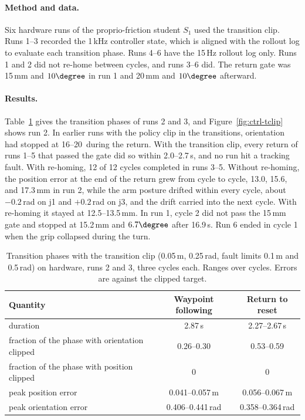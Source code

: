 \paragraph{Method and data.} Six hardware runs of the proprio-friction student $S_1$ used the transition clip. Runs 1--3 recorded the 1\,kHz controller state, which is aligned with the rollout log to evaluate each transition phase. Runs 4--6 have the 15\,Hz rollout log only. Runs 1 and 2 did not re-home between cycles, and runs 3--6 did. The return gate was 15\,mm and $10\degree$ in run 1 and 20\,mm and $10\degree$ afterward.

\paragraph{Results.} Table~\ref{tab:ctrl-tclip} gives the transition phases of runs 2 and 3, and Figure~\ref{fig:ctrl-tclip} shows run 2. In earlier runs with the policy clip in the transitions, orientation had stopped at 16--20\degree\ during the return. With the transition clip, every return of runs 1--5 that passed the gate did so within 2.0--2.7\,s, and no run hit a tracking fault. With re-homing, 12 of 12 cycles completed in runs 3--5. Without re-homing, the position error at the end of the return grew from cycle to cycle, 13.0, 15.6, and 17.3\,mm in run 2, while the arm posture drifted within every cycle, about $-0.2$\,rad on j1 and $+0.2$\,rad on j3, and the drift carried into the next cycle. With re-homing it stayed at 12.5--13.5\,mm. In run 1, cycle 2 did not pass the 15\,mm gate and stopped at 15.2\,mm and $6.7\degree$ after 16.9\,s. Run 6 ended in cycle 1 when the grip collapsed during the turn.

\begin{table}[!htbp]%
    \centering%
    \caption[Transition phases with the transition clip]{Transition phases with the transition clip (0.05\,m, 0.25\,rad, fault limits 0.1\,m and 0.5\,rad) on hardware, runs 2 and 3, three cycles each. Ranges over cycles. Errors are against the clipped target.}%
    \label{tab:ctrl-tclip}%
    \small
    \begin{tabular}{lcc}
        \toprule
        Quantity & Waypoint following & Return to reset \\
        \midrule
        duration & 2.87\,s & 2.27--2.67\,s \\
        fraction of the phase with orientation clipped & 0.26--0.30 & 0.53--0.59 \\
        fraction of the phase with position clipped & 0 & 0 \\
        peak position error & 0.041--0.057\,m & 0.056--0.067\,m \\
        peak orientation error & 0.406--0.441\,rad & 0.358--0.364\,rad \\
        \bottomrule
    \end{tabular}
\end{table}%

